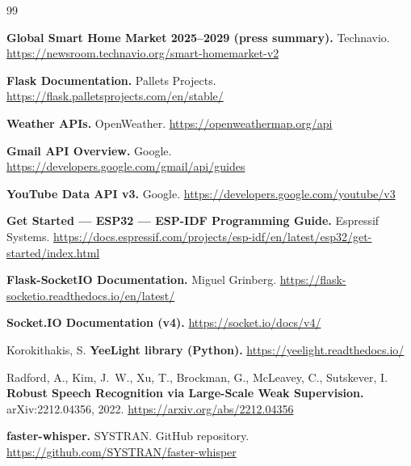 

\begin{thebibliography}{99}

\textbf{Global Smart Home Market 2025--2029 (press summary).} Technavio.
\newblock \url{https://newsroom.technavio.org/smart-homemarket-v2}

\textbf{Flask Documentation.} Pallets Projects.
\newblock \url{https://flask.palletsprojects.com/en/stable/}

\textbf{Weather APIs.} OpenWeather.
\newblock \url{https://openweathermap.org/api}

\textbf{Gmail API Overview.} Google.
\newblock \url{https://developers.google.com/gmail/api/guides}

\textbf{YouTube Data API v3.} Google.
\newblock \url{https://developers.google.com/youtube/v3}

\textbf{Get Started --- ESP32 --- ESP-IDF Programming Guide.} Espressif Systems.
\newblock \url{https://docs.espressif.com/projects/esp-idf/en/latest/esp32/get-started/index.html}

\textbf{Flask-SocketIO Documentation.} Miguel Grinberg.
\newblock \url{https://flask-socketio.readthedocs.io/en/latest/}

\textbf{Socket.IO Documentation (v4).}
\newblock \url{https://socket.io/docs/v4/}

Korokithakis, S.
\newblock \textbf{YeeLight library (Python).}
\newblock \url{https://yeelight.readthedocs.io/}

Radford, A., Kim, J.~W., Xu, T., Brockman, G., McLeavey, C., Sutskever, I.
\newblock \textbf{Robust Speech Recognition via Large-Scale Weak Supervision.} arXiv:2212.04356, 2022.
\newblock \url{https://arxiv.org/abs/2212.04356}

\textbf{faster-whisper.} SYSTRAN.
\newblock GitHub repository.
\newblock \url{https://github.com/SYSTRAN/faster-whisper}


\end{thebibliography}

